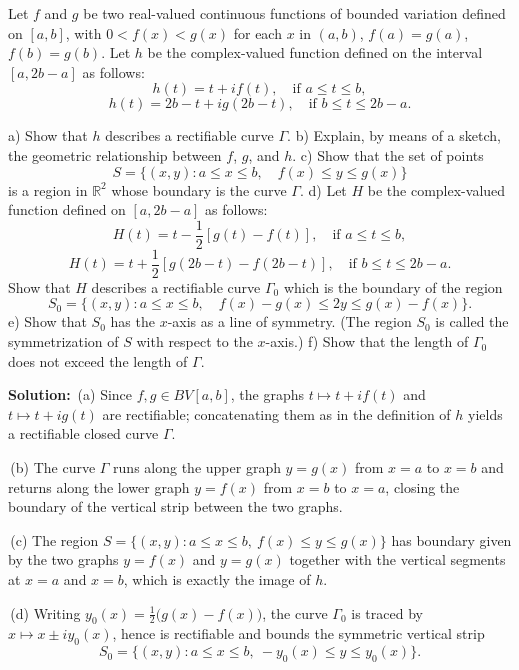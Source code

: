 \begin{problembox}
Let $f$ and $g$ be two real-valued continuous functions of bounded variation defined on $[a, b]$, with $0 < f(x) < g(x)$ for each $x$ in $(a, b)$, $f(a) = g(a)$, $f(b) = g(b)$. Let $h$ be the complex-valued function defined on the interval $[a, 2b - a]$ as follows:
\[h(t) = t + i f(t), \quad \text{if } a \leq t \leq b,\]
\[h(t) = 2b - t + ig(2b - t), \quad \text{if } b \leq t \leq 2b - a.\]

a) Show that $h$ describes a rectifiable curve $\Gamma$.
b) Explain, by means of a sketch, the geometric relationship between $f$, $g$, and $h$.
c) Show that the set of points
\[S = \{ (x, y) : a \leq x \leq b, \quad f(x) \leq y \leq g(x) \}\]
is a region in $\mathbb{R}^2$ whose boundary is the curve $\Gamma$.
d) Let $H$ be the complex-valued function defined on $[a, 2b - a]$ as follows:
\[H(t) = t - \frac{1}{2} [g(t) - f(t)], \quad \text{if } a \leq t \leq b,\]
\[H(t) = t + \frac{1}{2} [g(2b - t) - f(2b - t)], \quad \text{if } b \leq t \leq 2b - a.\]
Show that $H$ describes a rectifiable curve $\Gamma_0$ which is the boundary of the region
\[S_0 = \{ (x, y) : a \leq x \leq b, \quad f(x) - g(x) \leq 2y \leq g(x) - f(x) \}.\]
e) Show that $S_0$ has the $x$-axis as a line of symmetry. (The region $S_0$ is called the symmetrization of $S$ with respect to the $x$-axis.)
f) Show that the length of $\Gamma_0$ does not exceed the length of $\Gamma$.
\end{problembox}

\noindent\textbf{Solution:}
\,(a) Since $f,g\in BV[a,b]$, the graphs $t\mapsto t+if(t)$ and $t\mapsto t+ig(t)$ are rectifiable; concatenating them as in the definition of $h$ yields a rectifiable closed curve $\Gamma$.

\,(b) The curve $\Gamma$ runs along the upper graph $y=g(x)$ from $x=a$ to $x=b$ and returns along the lower graph $y=f(x)$ from $x=b$ to $x=a$, closing the boundary of the vertical strip between the two graphs.

\,(c) The region $S=\{(x,y): a\le x\le b,\ f(x)\le y\le g(x)\}$ has boundary given by the two graphs $y=f(x)$ and $y=g(x)$ together with the vertical segments at $x=a$ and $x=b$, which is exactly the image of $h$.

\,(d) Writing $y_0(x)=\tfrac12\big(g(x)-f(x)\big)$, the curve $\Gamma_0$ is traced by $x\mapsto x\pm i y_0(x)$, hence is rectifiable and bounds the symmetric vertical strip
\[S_0=\{(x,y): a\le x\le b,\ -y_0(x)\le y\le y_0(x)\}.\]

